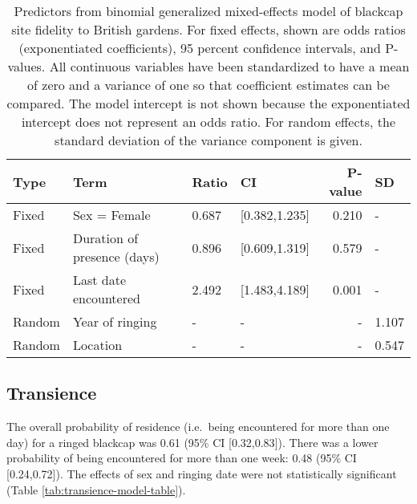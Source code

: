 \documentclass[a4paper, nobind]{templates/ociamthesis}
\begin{document}
\begin{table}[t]

\caption{\label{tab:fidelity-model-table}Predictors from binomial generalized mixed-effects model of blackcap site fidelity to British gardens. For fixed effects, shown are odds ratios (exponentiated coefficients), 95 percent confidence intervals, and P-values. All continuous variables have been standardized to have a mean of zero and a variance of one so that coefficient estimates can be compared. The model intercept is not shown because the exponentiated intercept does not represent an odds ratio. For random effects, the standard deviation of the variance component is given.}
\centering
\fontsize{9.5}{11.5}\selectfont
\begin{tabular}{l|l|l|l|r|l}
\hline
Type & Term & Ratio & CI & P-value & SD\\
\hline
Fixed & Sex = Female & 0.687 & [0.382,1.235] & 0.210 & -\\
\hline
Fixed & Duration of presence (days) & 0.896 & [0.609,1.319] & 0.579 & -\\
\hline
Fixed & Last date encountered & 2.492 & [1.483,4.189] & 0.001 & -\\
\hline
Random & Year of ringing & - & - & - & 1.107\\
\hline
Random & Location & - & - & - & 0.547\\
\hline
\end{tabular}
\end{table}

\hypertarget{transience-1}{%
\subsection{Transience}\label{transience-1}}

The overall probability of residence (i.e.~being encountered for more than one day) for a ringed blackcap was 0.61 (95\% CI {[}0.32,0.83{]}). There was a lower probability of being encountered for more than one week: 0.48 (95\% CI {[}0.24,0.72{]}). The effects of sex and ringing date were not statistically significant (Table \ref{tab:transience-model-table}).
\end{document}
